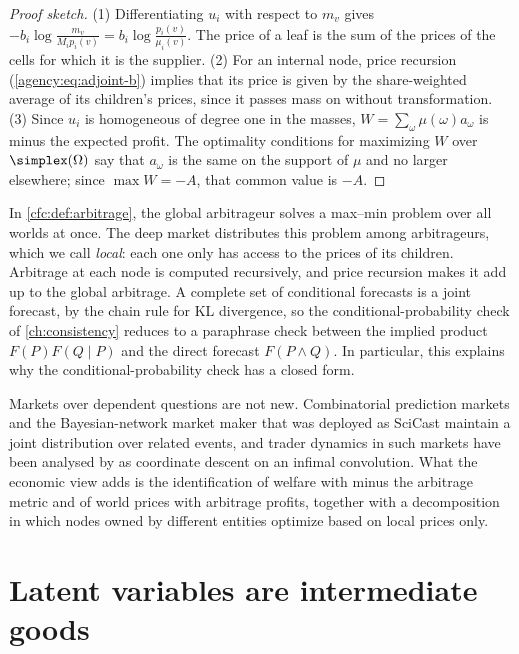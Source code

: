 \begin{draftblock}
\begin{proof}[Proof sketch]
(1) Differentiating $u_i$ with respect to $m_v$ gives $-b_i\log\frac{m_v}{M_ip_i(v)}=b_i\log\frac{p_i(v)}{\mu_i(v)}$. The price of a leaf is the sum of the prices of the cells for which it is the supplier. (2) For an internal node, price recursion (\cref{agency:eq:adjoint-b}) implies that its price is given by the share-weighted average of its children's prices, since it passes mass on without transformation. (3) Since $u_i$ is homogeneous of degree one in the masses, $W=\sum_\omega\mu(\omega)a_\omega$ is minus the expected profit. The optimality conditions for maximizing $W$ over $\simplex(\Omega)$ say that $a_\omega$ is the same on the support of $\mu$ and no larger elsewhere; since $\max W=-A$, that common value is $-A$.
\end{proof}

In \cref{cfc:def:arbitrage}, the global arbitrageur solves a max--min problem over all worlds at once. The deep market distributes this problem among arbitrageurs, which we call \emph{local}: each one only has access to the prices of its children. Arbitrage at each node is computed recursively, and price recursion makes it add up to the global arbitrage. A complete set of conditional forecasts is a joint forecast, by the chain rule for KL divergence, so the conditional-probability check of \cref{ch:consistency} reduces to a paraphrase check between the implied product $F(P)F(Q\mid P)$ and the direct forecast $F(P\wedge Q)$. In particular, this explains why the conditional-probability check has a closed form.

Markets over dependent questions are not new. Combinatorial prediction markets \citep{hansonCombinatorialInformationMarket2003} and the Bayesian-network market maker that was deployed as SciCast \citep{laskeyGraphicalModelMarket2018} maintain a joint distribution over related events, and trader dynamics in such markets have been analysed by \citet{frongilloConvergenceAnalysisPrediction2015} as coordinate descent on an infimal convolution. What the economic view adds is the identification of welfare with minus the arbitrage metric and of world prices with arbitrage profits, together with a decomposition in which nodes owned by different entities optimize based on local prices only.

\section{Latent variables are intermediate goods}\label{arb:sec:latent-goods}


\end{draftblock}
